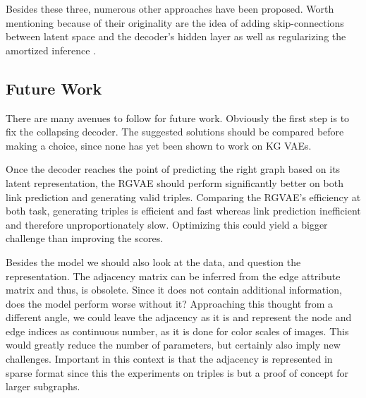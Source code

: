





Besides these three, numerous other approaches have been proposed. Worth mentioning because of their originality are the idea of adding skip-connections between latent space and the decoder's hidden layer \cite{dieng_avoiding_2019} as well as regularizing the amortized inference \cite{shu_amortized_2019}.  







\subsection{Future Work}

There are many avenues to follow for future work. Obviously the first step is to fix the collapsing decoder. The suggested solutions should be compared before making a choice, since none has yet been shown to work on KG VAEs.

Once the decoder reaches the point of predicting the right graph based on its latent representation, the RGVAE should perform significantly better on both link prediction and generating valid triples. Comparing the RGVAE's efficiency at both task, generating triples is efficient and fast whereas link prediction inefficient and therefore unproportionately slow. Optimizing this could yield a bigger challenge than improving the scores. 

Besides the model we should also look at the data, and question the representation. The adjacency matrix can be inferred from the edge attribute matrix and thus, is obsolete. Since it does not contain additional information, does the model perform worse without it? Approaching this thought from a different angle, we could leave the adjacency as it is and represent the node and edge indices as continuous number, as it is done for color scales of images. This would greatly reduce the number of parameters, but certainly also imply new challenges. Important in this context is that the adjacency is represented in sparse format since this the experiments on triples is but a proof of concept for larger subgraphs. 

